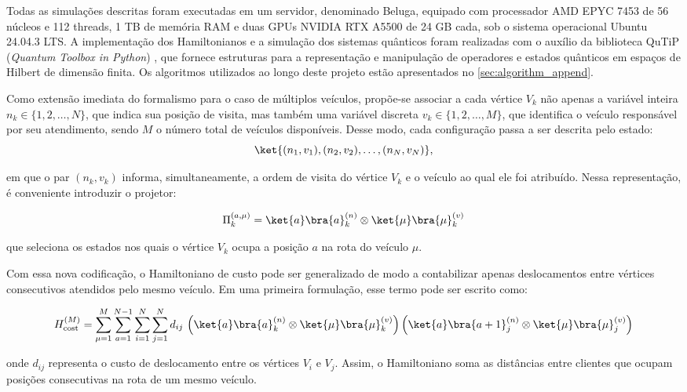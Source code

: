     Todas as simulações descritas foram executadas em um servidor, denominado Beluga, equipado com processador AMD EPYC 7453 de 56 núcleos e 112 threads, 1 TB de memória RAM e duas GPUs NVIDIA RTX A5500 de 24 GB cada, sob o sistema operacional Ubuntu 24.04.3 LTS. A implementação dos Hamiltonianos e a simulação dos sistemas quânticos foram realizadas com o auxílio da biblioteca QuTiP (\textit{Quantum Toolbox in Python}) \cite{qutip5}, que fornece estruturas para a representação e manipulação de operadores e estados quânticos em espaços de Hilbert de dimensão finita. Os algoritmos utilizados ao longo deste projeto estão apresentados no \autoref{sec:algorithm_append}. 

    Como extensão imediata do formalismo para o caso de múltiplos veículos, propõe-se associar a cada vértice $V_k$ não apenas a variável inteira $n_k \in \{1,2,\dots,N\}$, que indica sua posição de visita, mas também uma variável discreta $v_k \in \{1,2,\dots,M\}$, que identifica o veículo responsável por seu atendimento, sendo $M$ o número total de veículos disponíveis. Desse modo, cada configuração passa a ser descrita pelo estado:
    $$
    \ket{(n_1,v_1),(n_2,v_2),\dots,(n_N,v_N)},
    $$

    \noindent em que o par $(n_k,v_k)$ informa, simultaneamente, a ordem de visita do vértice $V_k$ e o veículo ao qual ele foi atribuído. Nessa representação, é conveniente introduzir o projetor:

    $$
    \Pi_k^{(a,\mu)}=\ket{a}\bra{a}_k^{(n)}\otimes \ket{\mu}\bra{\mu}_k^{(v)}
    $$

    \noindent que seleciona os estados nos quais o vértice $V_k$ ocupa a posição $a$ na rota do veículo $\mu$.

    Com essa nova codificação, o Hamiltoniano de custo pode ser generalizado de modo a contabilizar apenas deslocamentos entre vértices consecutivos atendidos pelo mesmo veículo. Em uma primeira formulação, esse termo pode ser escrito como:

    $$
        H_{\mathrm{cost}}^{(M)}
        =
        \sum_{\mu=1}^{M}
        \sum_{a=1}^{N-1}
        \sum_{i=1}^{N}
        \sum_{j=1}^{N}
        d_{ij}\,
        \left(\ket{a}\bra{a}_k^{(n)}\otimes \ket{\mu}\bra{\mu}_k^{(v)}\right)
        \left(\ket{a}\bra{a+1}_j^{(n)}\otimes \ket{\mu}\bra{\mu}_j^{(v)}\right)
    $$

    \noindent onde $d_{ij}$ representa o custo de deslocamento entre os vértices $V_i$ e $V_j$. Assim, o Hamiltoniano soma as distâncias entre clientes que ocupam posições consecutivas na rota de um mesmo veículo.

